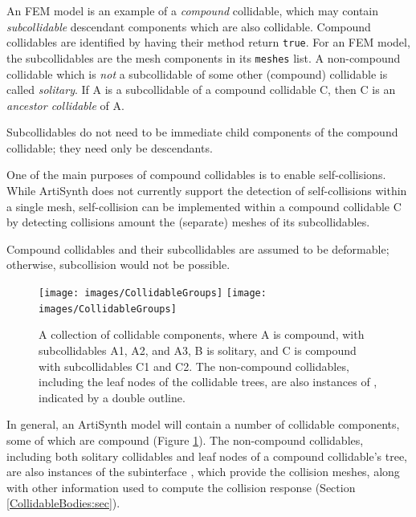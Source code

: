 An FEM model is an example of a {\it compound} collidable, which may
contain {\it subcollidable} descendant components which are also
collidable. Compound collidables are identified by having
their 
method return {\tt true}. For an FEM model, the subcollidables are the
mesh components in its {\tt meshes} list. A non-compound collidable
which is {\it not} a subcollidable of some other (compound)
collidable is called {\it solitary}. If A is a subcollidable of a
compound collidable C, then C is an {\it ancestor collidable} of A.

\begin{sideblock}
Subcollidables do not need to be immediate child components of
the compound collidable; they need only be descendants.
\end{sideblock}

One of the main purposes of compound collidables is to enable
self-collisions. While ArtiSynth does not currently support the
detection of self-collisions within a single mesh, self-collision can
be implemented within a compound collidable C by detecting collisions
amount the (separate) meshes of its subcollidables.

\begin{sideblock}
Compound collidables and their subcollidables are assumed to be
deformable; otherwise, subcollision would not be possible.
\end{sideblock}


\begin{figure}[ht]
\begin{center}
 \iflatexml
   \texttt{[image: images/CollidableGroups]}
 \else
   \texttt{[image: images/CollidableGroups]}
 \fi
\end{center}
\caption{A collection of collidable components, where A 
is compound, with subcollidables A1, A2, and A3, B is solitary, and C
is compound with subcollidables C1 and C2.  The non-compound
collidables, including the leaf nodes of the collidable trees, are
also instances of
,
indicated by a double outline.}
\label{CollidableGroups:fig}
\end{figure}

In general, an ArtiSynth model will contain a number of collidable
components, some of which are compound (Figure
\ref{CollidableGroups:fig}). The non-compound collidables, including
both solitary collidables and leaf nodes of a compound collidable's
tree, are also instances of the subinterface
, which provide
the collision meshes, along with other information used
to compute the collision response (Section
\ref{CollidableBodies:sec}).

